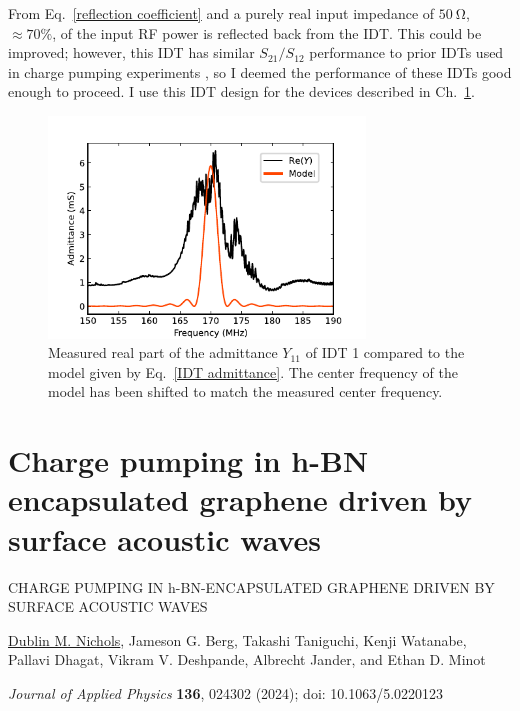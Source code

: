 \documentclass[double,12pt,1in,seploa]{beavtex}
\begin{document}
From Eq.\ \ref{reflection coefficient} and a purely real input impedance of $\SI{50}{\ohm}$, $\approx 70\%$, of the input RF power is reflected back from the IDT. This could be improved; however, this IDT has similar $S_{21}/S_{12}$ performance to prior IDTs used in charge pumping experiments \cite{buitelaar_charge_2006}, so I deemed the performance of these IDTs good enough to proceed. I use this IDT design for the devices described in Ch.\ \ref{AE charge pumping paper}.

\begin{figure}
    \includegraphics[width = 0.75\textwidth]{Z11_plot_.pdf}
    \caption{Measured real part of the admittance $Y_{11}$ of IDT 1 compared to the model given by Eq.\ \ref{IDT admittance}. The center frequency of the model has been shifted to match the measured center frequency.}
    \label{Z11 plot}
\end{figure}

\chapter{Charge pumping in h-BN encapsulated graphene driven by surface acoustic waves}\label{AE charge pumping paper}

\clearpage

\mbox{}
\vspace{3cm}
\begin{center}
    {\large CHARGE PUMPING IN h-BN-ENCAPSULATED GRAPHENE DRIVEN BY SURFACE ACOUSTIC WAVES}
    \vspace{4cm}

    \underline{Dublin M. Nichols}, Jameson G. Berg, Takashi Taniguchi, Kenji Watanabe, Pallavi Dhagat, Vikram V. Deshpande, Albrecht Jander, and Ethan D. Minot
    \vspace{3cm}

    \textit{Journal of Applied Physics} \textbf{136}, 024302 (2024); doi: 10.1063/5.0220123
\end{center}
\end{document}
